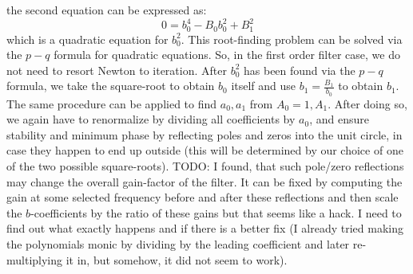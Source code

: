 the second equation can be expressed as:
\begin{equation}
 0 = b_0^4 - B_0 b_0^2 + B_1^2
\end{equation}
which is a quadratic equation for $b_0^2$. This root-finding problem can be solved via the $p-q$ formula for quadratic equations. So, in the first order filter case, we do not need to resort Newton to iteration. After $b_0^2$ has been found via the $p-q$ formula, we take the square-root to obtain $b_0$ itself and use $b_1 = \frac{B_1}{b_0}$ to obtain $b_1$. The same procedure can be applied to find $a_0, a_1$ from $A_0 = 1, A_1$. After doing so, we again have to renormalize by dividing all coefficients by $a_0$, and ensure stability and minimum phase by reflecting poles and zeros into the unit circle, in case they happen to end up outside (this will be determined by our choice of one of the two possible square-roots).
\newline
TODO: I found, that such pole/zero reflections may change the overall gain-factor of the filter. It can be fixed by computing the gain at some selected frequency before and after these reflections and then scale the $b$-coefficients by the ratio of these gains but that seems like a hack. I need to find out what exactly happens and if there is a better fix (I already tried making the polynomials monic by dividing by the leading coefficient and later re-multiplying it in, but somehow, it did not seem to work).





